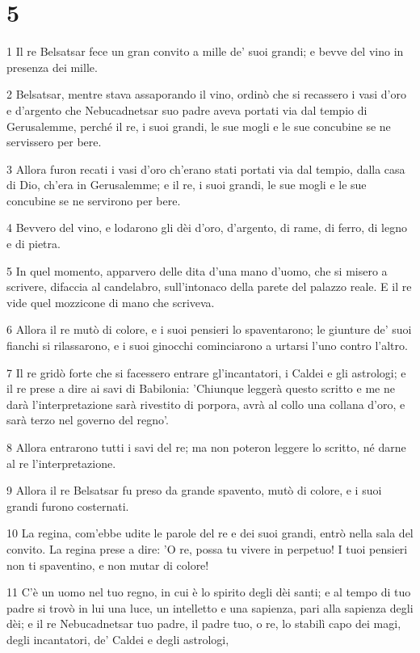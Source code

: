 \chapter{5}

\par 1 Il re Belsatsar fece un gran convito a mille de' suoi grandi; e bevve del vino in presenza dei mille.
\par 2 Belsatsar, mentre stava assaporando il vino, ordinò che si recassero i vasi d'oro e d'argento che Nebucadnetsar suo padre aveva portati via dal tempio di Gerusalemme, perché il re, i suoi grandi, le sue mogli e le sue concubine se ne servissero per bere.
\par 3 Allora furon recati i vasi d'oro ch'erano stati portati via dal tempio, dalla casa di Dio, ch'era in Gerusalemme; e il re, i suoi grandi, le sue mogli e le sue concubine se ne servirono per bere.
\par 4 Bevvero del vino, e lodarono gli dèi d'oro, d'argento, di rame, di ferro, di legno e di pietra.
\par 5 In quel momento, apparvero delle dita d'una mano d'uomo, che si misero a scrivere, difaccia al candelabro, sull'intonaco della parete del palazzo reale. E il re vide quel mozzicone di mano che scriveva.
\par 6 Allora il re mutò di colore, e i suoi pensieri lo spaventarono; le giunture de' suoi fianchi si rilassarono, e i suoi ginocchi cominciarono a urtarsi l'uno contro l'altro.
\par 7 Il re gridò forte che si facessero entrare gl'incantatori, i Caldei e gli astrologi; e il re prese a dire ai savi di Babilonia: 'Chiunque leggerà questo scritto e me ne darà l'interpretazione sarà rivestito di porpora, avrà al collo una collana d'oro, e sarà terzo nel governo del regno'.
\par 8 Allora entrarono tutti i savi del re; ma non poteron leggere lo scritto, né darne al re l'interpretazione.
\par 9 Allora il re Belsatsar fu preso da grande spavento, mutò di colore, e i suoi grandi furono costernati.
\par 10 La regina, com'ebbe udite le parole del re e dei suoi grandi, entrò nella sala del convito. La regina prese a dire: 'O re, possa tu vivere in perpetuo! I tuoi pensieri non ti spaventino, e non mutar di colore!
\par 11 C'è un uomo nel tuo regno, in cui è lo spirito degli dèi santi; e al tempo di tuo padre si trovò in lui una luce, un intelletto e una sapienza, pari alla sapienza degli dèi; e il re Nebucadnetsar tuo padre, il padre tuo, o re, lo stabilì capo dei magi, degli incantatori, de' Caldei e degli astrologi,
